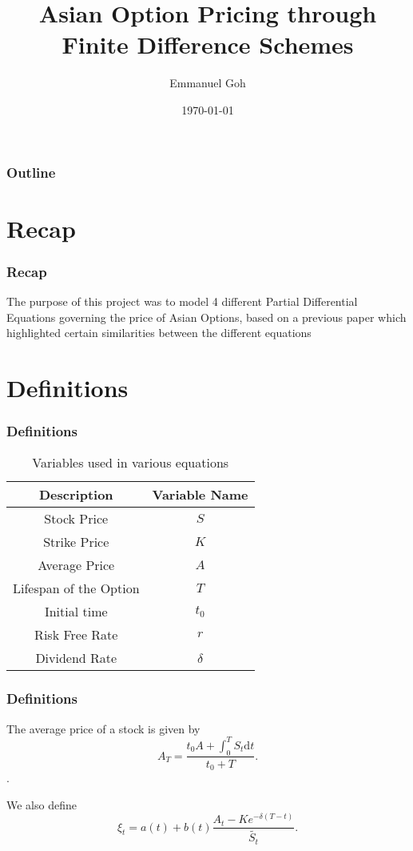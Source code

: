 \documentclass{beamer}
\title{Asian Option Pricing through Finite Difference Schemes}
\author{Emmanuel Goh}
\date{\today}
\begin{document}
  \begin{frame}
    \titlepage
  \end{frame}

  \begin{frame}
    \frametitle{Outline}
    \tableofcontents
  \end{frame}

  \section{Recap}
  \begin{frame}
    \frametitle{Recap}
    The purpose of this project was to model 4 different Partial Differential Equations governing the price of Asian Options, based on a previous paper which highlighted certain similarities between the different equations
  \end{frame}

  \section{Definitions}
  \begin{frame}
    \frametitle{Definitions}
    \begin{table}[h]
    \begin{tabular}{|c|c|}
      \hline
      \textbf{Description} & \textbf{Variable Name} \\ \hline
      Stock Price & \(S\) \\
      Strike Price & \(K\)\\
      Average Price & \(A\) \\
      Lifespan of the Option & \(T\) \\
      Initial time & \(t_0\) \\
      Risk Free Rate & \(r\) \\
      Dividend Rate & \(\delta\) \\
      \hline
    \end{tabular}
    \caption{Variables used in various equations}
    \label{table:name}
    \end{table}
  \end{frame}

  \begin{frame}
    \frametitle{Definitions}
    The average price of a stock is given by
    \begin{equation}
      A_T = \frac{t_0A + \int_0^T S_t \mathrm{d}t}{t_0 + T}.
    \end{equation}.

    We also define
    \begin{equation}
      \xi_t = a(t) + b(t) \frac{A_t - Ke^{-\delta(T-t)}}{\tilde{S_t}}.
    \end{equation}
  \end{frame}
\end{document}
